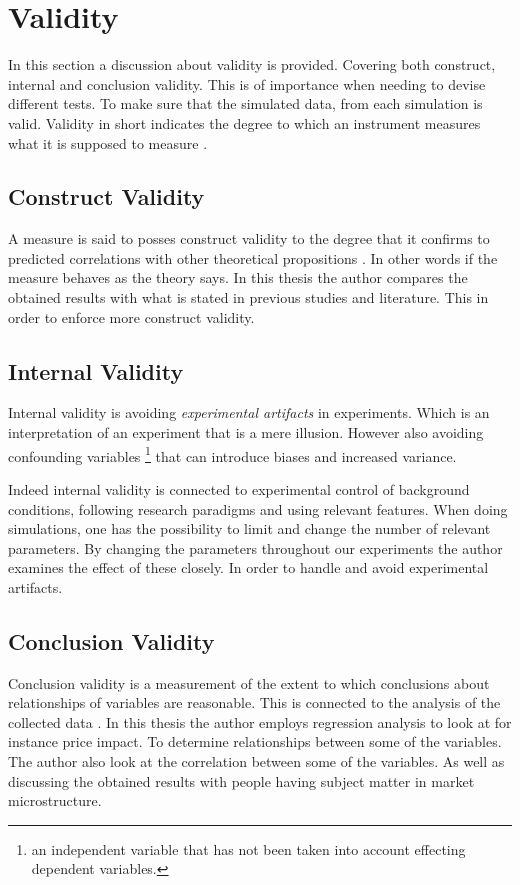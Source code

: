 \documentclass{kththesis}
\theoremstyle{definition}
\begin{document}
\section{Validity}
In this section a discussion about validity is provided. Covering both construct, internal and conclusion validity. This is of importance when needing to devise different tests. To make sure that the simulated data, from each simulation is valid. Validity in short indicates the degree to which an instrument measures what it is supposed to measure \parencite{kothari2004research}.

\subsection{Construct Validity}
A measure is said to posses construct validity to the degree that it confirms to predicted correlations with other theoretical propositions \parencite{kothari2004research}. In other words if the measure behaves as the theory says. In this thesis the author compares the obtained results with what is stated in previous studies and literature. This in order to enforce more construct validity.  

\subsection{Internal Validity}
Internal validity is avoiding \textit{experimental artifacts} in experiments. Which is an interpretation of an experiment that is a mere illusion. However also avoiding confounding variables \footnote{an independent variable that has not been taken into account effecting dependent variables.} that can introduce biases and increased variance. 

\newpage
Indeed internal validity is connected to experimental control of background conditions, following research paradigms and using relevant features. When doing simulations, one has the possibility to limit and change the number of relevant parameters. By changing the parameters throughout our experiments the author examines the effect of these closely. In order to handle and avoid experimental artifacts.

\subsection{Conclusion Validity}
Conclusion validity is a measurement of the extent to which conclusions about relationships of variables are reasonable. This is connected to the analysis of the collected data \parencite{trochim_2006}. In this thesis the author employs regression analysis to look at for instance price impact. To determine relationships between some of the variables. The author also look at the correlation between some of the variables. As well as discussing the obtained results with people having subject matter in market microstructure.
\end{document}
